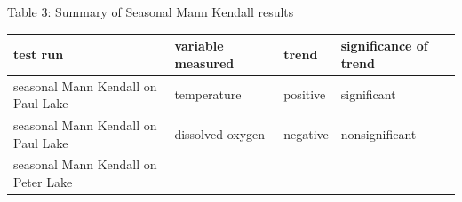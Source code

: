 \documentclass[12pt,]{article}
\begin{document}
Table 3: Summary of Seasonal Mann Kendall results

\begin{longtable}[]{@{}llll@{}}
\toprule
\begin{minipage}[b]{0.14\columnwidth}\raggedright\strut
test run\strut
\end{minipage} & \begin{minipage}[b]{0.22\columnwidth}\raggedright\strut
variable measured\strut
\end{minipage} & \begin{minipage}[b]{0.14\columnwidth}\raggedright\strut
trend\strut
\end{minipage} & \begin{minipage}[b]{0.23\columnwidth}\raggedright\strut
significance of trend\strut
\end{minipage}\tabularnewline
\midrule
\endhead
\begin{minipage}[t]{0.14\columnwidth}\raggedright\strut
seasonal Mann Kendall on Paul Lake\strut
\end{minipage} & \begin{minipage}[t]{0.22\columnwidth}\raggedright\strut
temperature\strut
\end{minipage} & \begin{minipage}[t]{0.14\columnwidth}\raggedright\strut
positive\strut
\end{minipage} & \begin{minipage}[t]{0.23\columnwidth}\raggedright\strut
significant\strut
\end{minipage}\tabularnewline
\begin{minipage}[t]{0.14\columnwidth}\raggedright\strut
seasonal Mann Kendall on Paul Lake\strut
\end{minipage} & \begin{minipage}[t]{0.22\columnwidth}\raggedright\strut
dissolved oxygen\strut
\end{minipage} & \begin{minipage}[t]{0.14\columnwidth}\raggedright\strut
negative\strut
\end{minipage} & \begin{minipage}[t]{0.23\columnwidth}\raggedright\strut
nonsignificant\strut
\end{minipage}\tabularnewline
\begin{minipage}[t]{0.14\columnwidth}\raggedright\strut
seasonal Mann Kendall on Peter Lake\strut
\end{minipage} & \begin{minipage}[t]{0.22\columnwidth}\raggedright\strut

\end{minipage}
\end{longtable}
\end{document}
